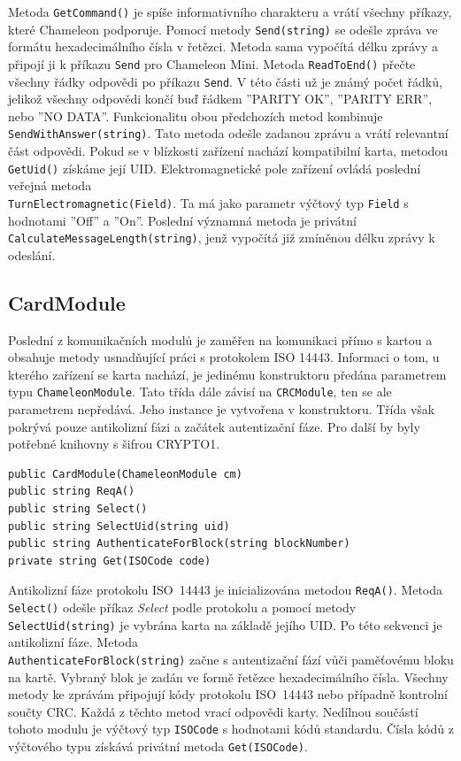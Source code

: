 Metoda \verb|GetCommand()| je spíše informativního charakteru a vrátí všechny příkazy, které Chameleon podporuje. Pomocí metody \verb|Send(string)| se odešle zpráva ve formátu hexadecimálního čísla v řetězci. Metoda sama vypočítá délku zprávy a připojí ji k příkazu \verb|Send| pro Chameleon Mini. Metoda \verb|ReadToEnd()| přečte všechny řádky odpovědi po příkazu \verb|Send|. V této části už je známý počet řádků, jelikož všechny odpovědi končí buď řádkem ''PARITY OK'', ''PARITY ERR'', nebo ''NO DATA''. Funkcionalitu obou předchozích metod kombinuje \verb|SendWithAnswer(string)|. Tato metoda odešle zadanou zprávu a vrátí relevantní část odpovědi. Pokud se v blízkosti zařízení nachází kompatibilní karta, metodou \verb|GetUid()| získáme její UID. Elektromagnetické pole zařízení ovládá poslední veřejná metoda \\\verb|TurnElectromagnetic(Field)|. Ta má jako parametr výčtový typ \verb|Field| s hodnotami ''Off'' a ''On''. Poslední významná metoda je privátní \verb|CalculateMessageLength(string)|, jenž vypočítá již zmíněnou délku zprávy k odeslání. 

\subsection*{CardModule}
Poslední z komunikačních modulů je zaměřen na komunikaci  přímo s kartou a obsahuje metody usnadňující práci s protokolem ISO 14443. Informaci o tom, u kterého zařízení se karta nachází, je jedinému konstruktoru předána parametrem typu \verb|ChameleonModule|. Tato třída dále závisí na \verb|CRCModule|, ten se ale parametrem nepředává. Jeho instance je vytvořena v konstruktoru. Třída však pokrývá pouze antikolizní fázi a začátek autentizační fáze. Pro další by byly potřebné knihovny s šifrou CRYPTO1. 
\begin{lstlisting}[caption=Metody třídy \emph{CardModule}, label={cardModuleMethods}]
public CardModule(ChameleonModule cm)
public string ReqA()
public string Select()
public string SelectUid(string uid)
public string AuthenticateForBlock(string blockNumber)
private string Get(ISOCode code)
\end{lstlisting}

Antikolizní fáze protokolu ISO~14443 je inicializována metodou \verb|ReqA()|. Metoda \verb|Select()| odešle příkaz \emph{Select} podle protokolu a pomocí metody \verb|SelectUid(string)| je vybrána karta na základě jejího UID. Po této sekvenci je antikolizní fáze. Metoda \\\verb|AuthenticateForBlock(string)| začne s autentizační fází vůči paměťovému bloku na kartě. Vybraný blok je zadán ve formě řetězce hexadecimálního čísla. Všechny metody ke zprávám připojují kódy protokolu ISO~14443 nebo případně kontrolní součty CRC. Každá z těchto metod vrací odpovědi karty. Nedílnou součástí tohoto modulu je výčtový typ \verb|ISOCode| s hodnotami kódů standardu. Čísla kódů z výčtového typu získává privátní metoda \verb|Get(ISOCode)|.

